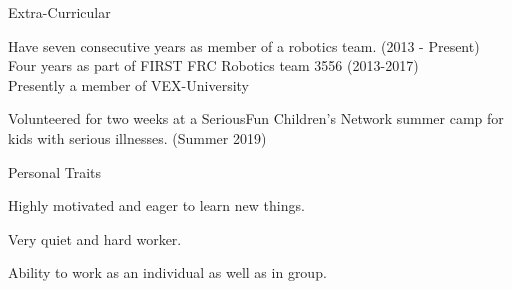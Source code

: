 \documentclass{resume} %
\begin{document}
\begin{rSection}{Extra-Curricular} \itemsep -3pt
	\item
	Have seven consecutive years as member of a robotics team. (2013 - Present)\\
	Four years as part of FIRST FRC Robotics team 3556 (2013-2017)\\
	Presently a member of VEX-University
	\item 
	Volunteered for two weeks at a SeriousFun Children's Network summer camp for kids 
	with serious illnesses. (Summer 2019)
\end{rSection}

\begin{rSection}{Personal Traits}
	\item 
	Highly motivated and eager to learn new things.
	\item 
	Very quiet and hard worker.
	\item 
	Ability to work as an individual as well as in group.
\end{rSection}
\end{document}
